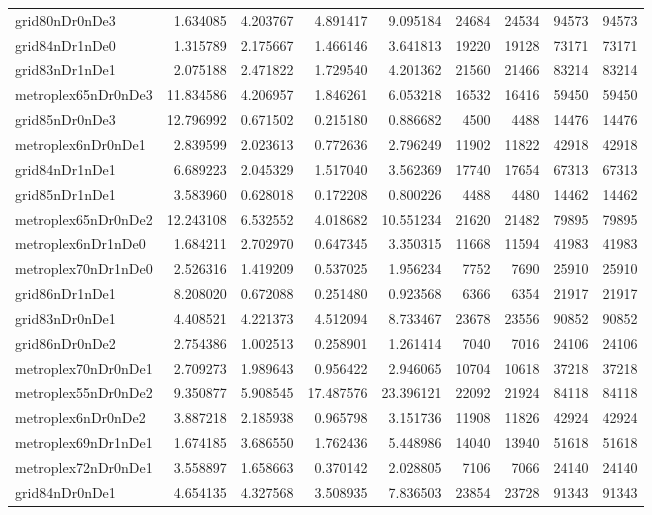 \begin{longtable}{|l|r|r|r|r|r|r|r|r|}
grid80nDr0nDe3 & 1.634085 & 4.203767 & 4.891417 & 9.095184 & 24684 & 24534 & 94573 & 94573 \\
grid84nDr1nDe0 & 1.315789 & 2.175667 & 1.466146 & 3.641813 & 19220 & 19128 & 73171 & 73171 \\
grid83nDr1nDe1 & 2.075188 & 2.471822 & 1.729540 & 4.201362 & 21560 & 21466 & 83214 & 83214 \\
metroplex65nDr0nDe3 & 11.834586 & 4.206957 & 1.846261 & 6.053218 & 16532 & 16416 & 59450 & 59450 \\
grid85nDr0nDe3 & 12.796992 & 0.671502 & 0.215180 & 0.886682 & 4500 & 4488 & 14476 & 14476 \\
metroplex6nDr0nDe1 & 2.839599 & 2.023613 & 0.772636 & 2.796249 & 11902 & 11822 & 42918 & 42918 \\
grid84nDr1nDe1 & 6.689223 & 2.045329 & 1.517040 & 3.562369 & 17740 & 17654 & 67313 & 67313 \\
grid85nDr1nDe1 & 3.583960 & 0.628018 & 0.172208 & 0.800226 & 4488 & 4480 & 14462 & 14462 \\
metroplex65nDr0nDe2 & 12.243108 & 6.532552 & 4.018682 & 10.551234 & 21620 & 21482 & 79895 & 79895 \\
metroplex6nDr1nDe0 & 1.684211 & 2.702970 & 0.647345 & 3.350315 & 11668 & 11594 & 41983 & 41983 \\
metroplex70nDr1nDe0 & 2.526316 & 1.419209 & 0.537025 & 1.956234 & 7752 & 7690 & 25910 & 25910 \\
grid86nDr1nDe1 & 8.208020 & 0.672088 & 0.251480 & 0.923568 & 6366 & 6354 & 21917 & 21917 \\
grid83nDr0nDe1 & 4.408521 & 4.221373 & 4.512094 & 8.733467 & 23678 & 23556 & 90852 & 90852 \\
grid86nDr0nDe2 & 2.754386 & 1.002513 & 0.258901 & 1.261414 & 7040 & 7016 & 24106 & 24106 \\
metroplex70nDr0nDe1 & 2.709273 & 1.989643 & 0.956422 & 2.946065 & 10704 & 10618 & 37218 & 37218 \\
metroplex55nDr0nDe2 & 9.350877 & 5.908545 & 17.487576 & 23.396121 & 22092 & 21924 & 84118 & 84118 \\
metroplex6nDr0nDe2 & 3.887218 & 2.185938 & 0.965798 & 3.151736 & 11908 & 11826 & 42924 & 42924 \\
metroplex69nDr1nDe1 & 1.674185 & 3.686550 & 1.762436 & 5.448986 & 14040 & 13940 & 51618 & 51618 \\
metroplex72nDr0nDe1 & 3.558897 & 1.658663 & 0.370142 & 2.028805 & 7106 & 7066 & 24140 & 24140 \\
grid84nDr0nDe1 & 4.654135 & 4.327568 & 3.508935 & 7.836503 & 23854 & 23728 & 91343 & 91343 \\

\end{longtable}
